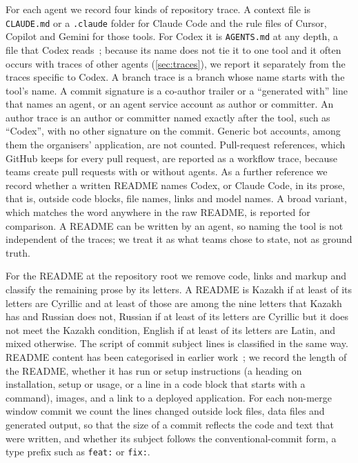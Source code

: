 \documentclass{article}
\begin{document}
For each agent we record four kinds of repository trace. A context file is \texttt{CLAUDE.md} or a \texttt{.claude} folder for Claude Code and the rule files of Cursor, Copilot and Gemini for those tools. For Codex it is \texttt{AGENTS.md} at any depth, a file that Codex reads~\cite{openai2026agentsmd}; because its name does not tie it to one tool and it often occurs with traces of other agents (\cref{sec:traces}), we report it separately from the traces specific to Codex. A branch trace is a branch whose name starts with the tool's name. A commit signature is a co-author trailer or a ``generated with'' line that names an agent, or an agent service account as author or committer. An author trace is an author or committer named exactly after the tool, such as ``Codex'', with no other signature on the commit. Generic bot accounts, among them the organisers' application, are not counted. Pull-request references, which GitHub keeps for every pull request, are reported as a workflow trace, because teams create pull requests with or without agents. As a further reference we record whether a written README names Codex, or Claude Code, in its prose, that is, outside code blocks, file names, links and model names. A broad variant, which matches the word anywhere in the raw README, is reported for comparison. A README can be written by an agent, so naming the tool is not independent of the traces; we treat it as what teams chose to state, not as ground truth.

For the README at the repository root we remove code, links and markup and classify the remaining prose by its letters. A README is Kazakh if at least \thrcyr{} of its letters are Cyrillic and at least \thrkaz{} of those are among the nine letters that Kazakh has and Russian does not, Russian if at least \thrcyr{} of its letters are Cyrillic but it does not meet the Kazakh condition, English if at least \thrlat{} of its letters are Latin, and mixed otherwise. The script of commit subject lines is classified in the same way. README content has been categorised in earlier work~\cite{prana2019readme}; we record the length of the README, whether it has run or setup instructions (a heading on installation, setup or usage, or a line in a code block that starts with a command), images, and a link to a deployed application. For each non-merge window commit we count the lines changed outside lock files, data files and generated output, so that the size of a commit reflects the code and text that were written, and whether its subject follows the conventional-commit form, a type prefix such as \texttt{feat:} or \texttt{fix:}.
\end{document}
